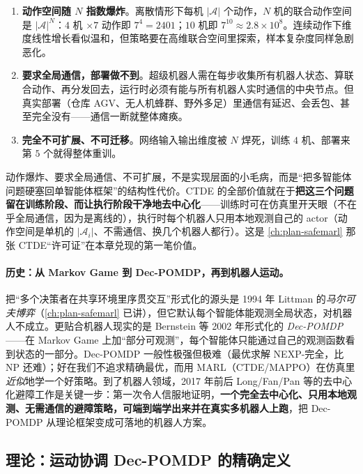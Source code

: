 \begin{enumerate}
  \item \textbf{动作空间随 $N$ 指数爆炸}。离散情形下每机 $|\mathcal{A}|$ 个动作，$N$ 机的联合动作空间是 $|\mathcal{A}|^N$：$4$ 机 $\times 7$ 动作即 $7^4=2401$；$10$ 机即 $7^{10}\approx 2.8\times10^8$。连续动作下维度线性增长看似温和，但策略要在高维联合空间里探索，样本复杂度同样急剧恶化。
  \item \textbf{要求全局通信，部署做不到}。超级机器人需在每步收集所有机器人状态、算联合动作、再分发回去，运行时必须有能与所有机器人实时通信的中央节点。但真实部署（仓库 AGV、无人机蜂群、野外多足）里通信有延迟、会丢包、甚至完全没有——通信一断就整体瘫痪。
  \item \textbf{完全不可扩展、不可迁移}。网络输入输出维度被 $N$ 焊死，训练 $4$ 机、部署来第 $5$ 个就得整体重训。
\end{enumerate}

\begin{insight}
动作爆炸、要求全局通信、不可扩展，不是实现层面的小毛病，而是“把多智能体问题硬塞回单智能体框架”的结构性代价。CTDE 的全部价值就在于\textbf{把这三个问题留在训练阶段、而让执行阶段干净地去中心化}——训练时可在仿真里开天眼（不在乎全局通信，因为是离线的），执行时每个机器人只用本地观测自己的 actor（动作空间是单机的 $|\mathcal{A}_i|$、不需通信、换几个机器人都行）。这是 \cref{ch:plan-safemarl} 那张 CTDE“许可证”在本章兑现的第一笔价值。
\end{insight}

\paragraph{历史：从 Markov Game 到 Dec-POMDP，再到机器人运动。}
把“多个决策者在共享环境里序贯交互”形式化的源头是 1994 年 Littman 的\emph{马尔可夫博弈}\cite{littman1994markov}（\cref{ch:plan-safemarl} 已讲），但它默认每个智能体能观测全局状态，对机器人不成立。更贴合机器人现实的是 Bernstein 等 2002 年形式化的 \emph{Dec-POMDP}\cite{bernstein2002decpomdp}——在 Markov Game 上加“部分可观测”，每个智能体只能通过自己的观测函数看到状态的一部分。Dec-POMDP 一般性极强但极难（最优求解 NEXP-完全，比 NP 还难）；好在我们不追求精确最优，而用 MARL（CTDE/MAPPO）在仿真里\emph{近似}地学一个好策略。到了机器人领域，2017 年前后 Long/Fan/Pan 等的去中心化避障工作是关键一步\cite{long2018collision}：第一次令人信服地证明，\textbf{一个完全去中心化、只用本地观测、无需通信的避障策略，可端到端学出来并在真实多机器人上跑}，把 Dec-POMDP 从理论框架变成可落地的机器人方案。

\subsection{理论：运动协调 Dec-POMDP 的精确定义}
\label{sec:mc-decpomdp-def}

